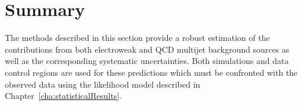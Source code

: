 \section{Summary}

The methods described in this section provide a robust estimation of the 
contributions from both electroweak and QCD multijet background sources
as well as the corresponding systematic uncertainties. Both simulations 
and data control regions are used for these predictions which must 
be confronted with the observed data using the likelihood model described
in Chapter~\ref{cha:statisticalResults}.



